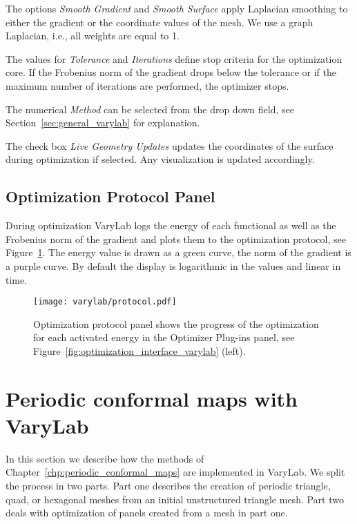 \documentclass[Thesis.tex]{subfiles}
\begin{document}
The options \emph{Smooth Gradient} and \emph{Smooth Surface} apply Laplacian smoothing to either the gradient or the coordinate values of the mesh. We use a graph Laplacian, i.e., all weights are equal to 1.

The values for \emph{Tolerance} and \emph{Iterations} define stop criteria for the optimization core. If the Frobenius norm of the gradient drops below the tolerance or if the maximum number of iterations are performed, the optimizer stops. 

The numerical \emph{Method} can be selected from the drop down field, see Section~\ref{sec:general_varylab} for explanation.

The check box \emph{Live Geometry Updates} updates the coordinates of the surface during optimization if selected. Any visualization is updated accordingly.

\subsection*{Optimization Protocol Panel}

During optimization {\sc VaryLab} logs the energy of each functional as well as the Frobenius norm of the gradient and plots them to the optimization protocol, see Figure~\ref{fig:protocol_interface_varylab}. The energy value is drawn as a green curve, the norm of the gradient is a purple curve. By default the display is logarithmic in the values and linear in time.

\begin{figure}
\begin{center}
\texttt{[image: varylab/protocol.pdf]}
\caption{Optimization protocol panel shows the progress of the optimization for each activated energy in the Optimizer Plug-ins panel, see Figure~\ref{fig:optimization_interface_varylab} (left).}
\label{fig:protocol_interface_varylab}
\end{center}
\end{figure}

\section{Periodic conformal maps with {\sc VaryLab}}
\label{sec:periodic_varylab}
In this section we describe how the methods of Chapter~\ref{chp:periodic_conformal_maps} are implemented in {\sc VaryLab}. We split the process in two parts. Part one describes the creation of periodic triangle, quad, or hexagonal meshes from an initial unstructured triangle mesh. Part two deals with optimization of panels created from a mesh in part one.
\end{document}
